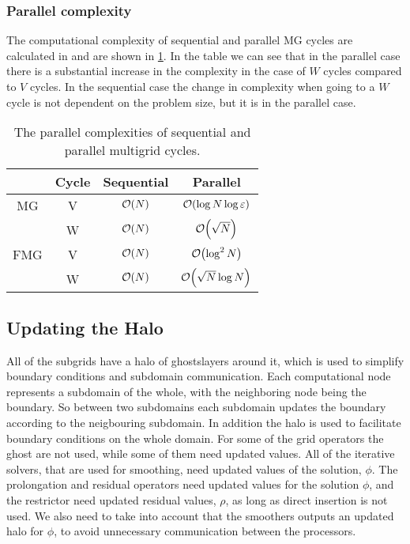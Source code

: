 		\subsubsection{Parallel complexity}
			\label{sec:para_comp}
			The computational complexity of sequential and
			parallel MG cycles are calculated in \citet{hackbusch_multigrid_1982} and are
			shown in \cref{tab:parallel_complexity}. In the table we can see that in
			the parallel case there is a substantial increase in the complexity in the
			case of \(W\) cycles compared to \(V\) cycles. In the sequential case the
			change in complexity when going to a \(W\) cycle is not dependent on the
			problem size, but it is in the parallel case.


		\begin{table}
			\centering
			\begin{tabular}{ c  c c c}
				& Cycle & Sequential & Parallel
			  	\\  \hline
			  	MG & V & \(\order{N}\) & \(\order{\log N\log\varepsilon}\)
			  	\\
			  	& W & $\order{N}$ & $\order{\sqrt{N}}$
			  	\\ \hline
				FMG & V & $\order{N}$ & $\order{\log^2 N}$
				\\
				& W & $\order{N}$ & \( \order{\sqrt{N} \log{N}} \)
			\end{tabular}
			\caption{The parallel complexities of sequential and parallel multigrid cycles. }
			\label{tab:parallel_complexity}
		\end{table}

		\subsection{Updating the Halo}
		All of the subgrids have a halo of ghostslayers around it, which is used to simplify boundary conditions and subdomain communication. Each computational node
		represents a subdomain of the whole, with the neighboring node being the boundary. So between two subdomains each subdomain updates the boundary according to
		the neigbouring subdomain. In addition the halo is used to facilitate boundary conditions on the whole domain. For some of the grid operators
		the ghost are not used, while some of them need updated values. All of the iterative solvers, that are used
		for smoothing, need updated values of the solution, \(\phi\). The prolongation and residual operators need updated values
		for the solution \(\phi\), and the restrictor need updated residual values, \(\rho\), as long as direct insertion is not used.
		We also need to take into account that the smoothers outputs an updated halo for \(\phi\), to avoid
		unnecessary communication between the processors.




